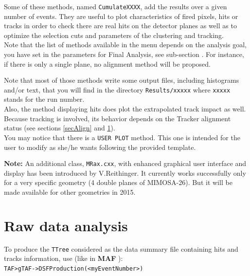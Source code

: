 \documentclass[a4paper, 12pt, twoside]{article}
\newcommand{\MAF}{{\bf MAF }}
\begin{document}
\noindent
Some of these methods, named {\tt CumulateXXXX}, add the results over a given number of events. They are useful to plot characteristics of fired pixels, hits or tracks in order to check there are real hits on the detector planes as well as to optimize the selection cuts and parameters of the clustering and tracking.\\

\noindent
Note that the list of methods available in the menu depends on the analysis goal, you have set in the parameters for Final Analysis, see sub-section \label{subsec:paramFinalAnalysis}. For instance, if there is only a single plane, no alignment method will be proposed.

\noindent
Note that most of those methods write some output files, including histograms and/or text, that you will find in the directory {\tt Results/xxxxx} where {\tt xxxxx} stands for the run number.\\
Also, the method displaying hits does plot the extrapolated track impact as well. Because tracking is involved, its behavior depends on the Tracker alignment status (see sections \ref{secAlign} and \ref{secRawdata}).\\

\noindent
You may notice that there is a {\tt USER PLOT} method. This one is intended for the user to modify as she/he wants following the provided template.

\vspace{.8 cm}

\noindent
{\bf Note:} An additional class, {\tt MRax.cxx}, with enhanced graphical user interface and display has been introduced by V.Reithinger. It currently works successfully only for a very specific geometry (4 double planes of MIMOSA-26). But it will be made available for other geometries in 2015.\\



\vspace{2cm}

\section{Raw data analysis}
\label{secRawdata}

To produce the {\tt TTree} considered as the data summary file containing hits and tracks information, use (like in \MAF):\\
{\tt TAF>gTAF->DSFProduction(<myEventNumber>)}\\
\end{document}
